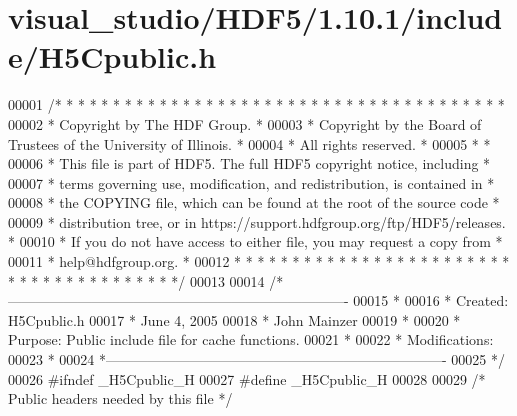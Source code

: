 \hypertarget{visual__studio_2_h_d_f5_21_810_81_2include_2_h5_cpublic_8h_source}{}\section{visual\+\_\+studio/\+H\+D\+F5/1.10.1/include/\+H5\+Cpublic.h}
\label{visual__studio_2_h_d_f5_21_810_81_2include_2_h5_cpublic_8h_source}

\begin{DoxyCode}
00001 \textcolor{comment}{/* * * * * * * * * * * * * * * * * * * * * * * * * * * * * * * * * * * * * * *}
00002 \textcolor{comment}{ * Copyright by The HDF Group.                                               *}
00003 \textcolor{comment}{ * Copyright by the Board of Trustees of the University of Illinois.         *}
00004 \textcolor{comment}{ * All rights reserved.                                                      *}
00005 \textcolor{comment}{ *                                                                           *}
00006 \textcolor{comment}{ * This file is part of HDF5.  The full HDF5 copyright notice, including     *}
00007 \textcolor{comment}{ * terms governing use, modification, and redistribution, is contained in    *}
00008 \textcolor{comment}{ * the COPYING file, which can be found at the root of the source code       *}
00009 \textcolor{comment}{ * distribution tree, or in https://support.hdfgroup.org/ftp/HDF5/releases.  *}
00010 \textcolor{comment}{ * If you do not have access to either file, you may request a copy from     *}
00011 \textcolor{comment}{ * help@hdfgroup.org.                                                        *}
00012 \textcolor{comment}{ * * * * * * * * * * * * * * * * * * * * * * * * * * * * * * * * * * * * * * */}
00013 
00014 \textcolor{comment}{/*-------------------------------------------------------------------------}
00015 \textcolor{comment}{ *}
00016 \textcolor{comment}{ * Created: H5Cpublic.h}
00017 \textcolor{comment}{ *              June 4, 2005}
00018 \textcolor{comment}{ *              John Mainzer}
00019 \textcolor{comment}{ *}
00020 \textcolor{comment}{ * Purpose:     Public include file for cache functions.}
00021 \textcolor{comment}{ *}
00022 \textcolor{comment}{ * Modifications:}
00023 \textcolor{comment}{ *}
00024 \textcolor{comment}{ *-------------------------------------------------------------------------}
00025 \textcolor{comment}{ */}
00026 \textcolor{preprocessor}{#ifndef \_H5Cpublic\_H}
00027 \textcolor{preprocessor}{#define \_H5Cpublic\_H}
00028 
00029 \textcolor{comment}{/* Public headers needed by this file */}

\end{DoxyCode}
